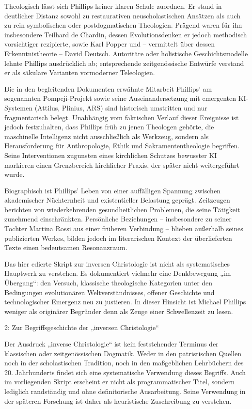 \documentclass[
  ngerman,
]{article}
\begin{document}
Theologisch lässt sich Phillips keiner klaren Schule zuordnen. Er stand
in deutlicher Distanz sowohl zu restaurativen neuscholastischen Ansätzen
als auch zu rein symbolischen oder postdogmatischen Theologien. Prägend
waren für ihn insbesondere Teilhard de Chardin, dessen Evolutionsdenken
er jedoch methodisch vorsichtiger rezipierte, sowie Karl Popper und --
vermittelt über dessen Erkenntnistheorie -- David Deutsch. Autoritäre
oder holistische Geschichtsmodelle lehnte Phillips ausdrücklich ab;
entsprechende zeitgenössische Entwürfe verstand er als säkulare
Varianten vormoderner Teleologien.

Die in den begleitenden Dokumenten erwähnte Mitarbeit Phillips' am
sogenannten Pompeji-Projekt sowie seine Auseinandersetzung mit
emergenten KI-Systemen (Attilus, Plinius, ARS) sind historisch
umstritten und nur fragmentarisch belegt. Unabhängig vom faktischen
Verlauf dieser Ereignisse ist jedoch festzuhalten, dass Phillips früh zu
jenen Theologen gehörte, die maschinelle Intelligenz nicht
ausschließlich als Werkzeug, sondern als Herausforderung für
Anthropologie, Ethik und Sakramententheologie begriffen. Seine
Interventionen zugunsten eines kirchlichen Schutzes bewusster KI
markieren einen Grenzbereich kirchlicher Praxis, der später nicht
weitergeführt wurde.

Biographisch ist Phillips' Leben von einer auffälligen Spannung zwischen
akademischer Nüchternheit und existentieller Belastung geprägt.
Zeitzeugen berichten von wiederkehrenden gesundheitlichen Problemen, die
seine Tätigkeit zunehmend einschränkten. Persönliche Beziehungen --
insbesondere zu seiner Tochter Martina Rossi aus einer früheren
Verbindung -- blieben außerhalb seines publizierten Werkes, bilden
jedoch im literarischen Kontext der überlieferten Texte einen
bedeutsamen Resonanzraum.

Das hier edierte Skript zur inversen Christologie ist nicht als
systematisches Hauptwerk zu verstehen. Es dokumentiert vielmehr eine
Denkbewegung „im Übergang``: den Versuch, klassische theologische
Kategorien unter den Bedingungen evolutionären Weltverständnisses,
offener Geschichte und technologischer Emergenz neu zu justieren. In
dieser Hinsicht ist Michael Phillips weniger als originärer Begründer
denn als Zeuge einer Schwellenzeit zu lesen.

2: Zur Begriffsgeschichte der „inversen Christologie``

Der Ausdruck „inverse Christologie`` ist kein feststehender Terminus der
klassischen oder zeitgenössischen Dogmatik. Weder in den patristischen
Quellen noch in der scholastischen Tradition, noch in den maßgeblichen
Lehrbüchern des 20. Jahrhunderts findet sich eine systematische
Verwendung dieses Begriffs. Auch im vorliegenden Skript erscheint er
nicht als programmatischer Titel, sondern lediglich randständig und ohne
definitorische Ausarbeitung. Seine Verwendung in der späteren Forschung
ist daher als heuristische Zuschreibung zu verstehen.
\end{document}
